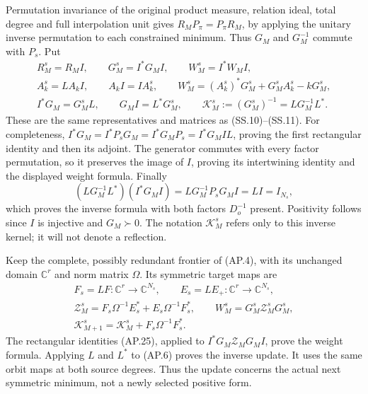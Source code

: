 Permutation invariance of the original product measure, relation
ideal, total degree and full interpolation unit gives
\(R_MP_\pi=P_\pi R_M\), by applying the unitary inverse
permutation to each constrained minimum.  Thus \(G_M\) and
\(G_M^{-1}\) commute with \(P_s\).  Put
\[
 \begin{gathered}
 R_M^s=R_MI,\qquad G_M^s=I^*G_MI,\qquad W_M^s=I^*W_MI,\\
 A_k^s=LA_kI,\qquad A_kI=IA_k^s,\qquad
 W_M^s=(A_k^s)^*G_M^s+G_M^sA_k^s-kG_M^s,\\
 I^*G_M=G_M^sL,\qquad G_MI=L^*G_M^s,\qquad
 \mathcal K_M^s:=(G_M^s)^{-1}=LG_M^{-1}L^*.
 \end{gathered}                                                \tag{AP.25}
\]
These are the same representatives and matrices as (SS.10)--(SS.11).
For completeness, \(I^*G_M=I^*P_sG_M=I^*G_MP_s
=I^*G_MIL\), proving the first rectangular identity and then
its adjoint.  The generator commutes with every factor permutation,
so it preserves the image of \(I\), proving its intertwining
identity and the displayed weight formula.  Finally
\[
 (LG_M^{-1}L^*)(I^*G_MI)
 =LG_M^{-1}P_sG_MI=LI=I_{N_s},
\]
which proves the inverse formula with both factors \(D_o^{-1}\)
present.  Positivity follows since \(I\) is injective and
\(G_M\succ0\).  The notation \(\mathcal K_M^s\) refers
only to this inverse kernel; it will not denote a reflection.

Keep the complete, possibly redundant frontier of (AP.4), with its
unchanged domain \(\mathbb C^r\) and norm matrix \(\Omega\).
Its symmetric target maps are
\[
 \begin{gathered}
 F_s=LF:\mathbb C^r\longrightarrow\mathbb C^{N_s},\qquad
 E_s=LE_+:\mathbb C^r\longrightarrow\mathbb C^{N_s},\\
 \mathcal Z_M^s=F_s\Omega^{-1}E_s^*
                          +E_s\Omega^{-1}F_s^*,\qquad
 W_M^s=G_M^s\mathcal Z_M^sG_M^s,\\
 \mathcal K_{M+1}^s=\mathcal K_M^s
                                      +F_s\Omega^{-1}F_s^*.
 \end{gathered}                                                \tag{AP.26}
\]
The rectangular identities (AP.25), applied to
\(I^*G_M\mathcal Z_MG_MI\), prove the weight formula.
Applying \(L\) and \(L^*\) to (AP.6) proves the inverse
update.  It uses the same orbit maps at both source degrees.
Thus the update concerns the actual next symmetric minimum, not a
newly selected positive form.

